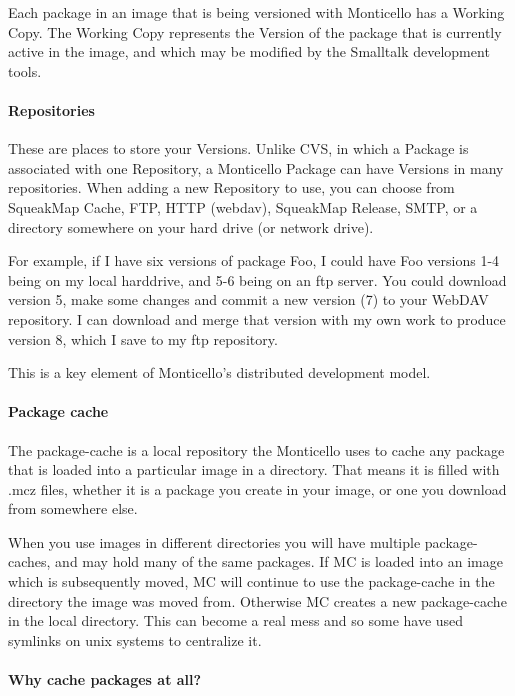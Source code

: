 \documentclass[a4paper,10pt,twoside]{book}
\begin{document}
Each package in an image that is being versioned with Monticello has a Working Copy. The Working Copy represents the Version of the package that is currently active in the image, and which may be modified by the Smalltalk development tools.

\paragraph{Repositories}

These are places to store your Versions. Unlike CVS, in which a Package is associated with one Repository, a Monticello Package can have Versions in many repositories. When adding a new Repository to use, you can choose from SqueakMap Cache, FTP, HTTP (webdav), SqueakMap Release, SMTP, or a directory somewhere on your hard drive (or network drive).

For example, if I have six versions of package Foo, I could have Foo versions 1-4 being on my local harddrive, and 5-6 being on an ftp server. You could download version 5, make some changes and commit a new version (7) to your WebDAV repository. I can download and merge that version with my own work to produce version 8, which I save to my ftp repository.

This is a key element of Monticello's distributed development model.

\paragraph{Package cache}

The package-cache is a local repository the Monticello uses to cache any package that is loaded into a particular image in a directory. That means it is filled with .mcz files, whether it is a package you create in your image, or one you download from somewhere else.

When you use images in different directories you will have multiple package-caches, and may hold many of the same packages. If MC is loaded into an image which is subsequently moved, MC will continue to use the package-cache in the directory the image was moved from. Otherwise MC creates a new package-cache in the local directory. This can become a real mess and so some have used symlinks on unix systems to centralize it.

\paragraph{Why cache packages at all?}
\end{document}
